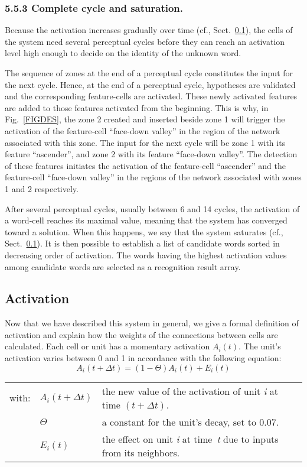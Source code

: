 \documentclass[ijdar]{svjour}
\begin{document}
\subsubsection{5.5.3 Complete cycle and saturation.}


Because the activation increases gradually over time ({cf.},  Sect.~\ref{sec-act}), the cells of the system need several perceptual cycles before they can reach an activation level high enough to decide on the identity of the unknown word.

The sequence of zones at the end of a perceptual cycle constitutes the input for the next cycle.
Hence, at the end of a perceptual cycle, hypotheses are validated and the corresponding feature-cells are activated.
These newly activated features are added to those features activated from the beginning.
This is why, in Fig.~\ref{FIGDES}, the zone 2 created and inserted beside zone 1 will trigger the activation of the feature-cell ``face-down valley'' in the region of the network associated with this zone.
The input for the next cycle will be zone 1 with its feature ``ascender'', and zone 2 with its feature ``face-down valley''.
The detection of these features initiates the activation of the feature-cell ``ascender'' and the feature-cell ``face-down valley'' in the regions of the network associated with zones 1 and 2 respectively.

After several perceptual cycles, usually between 6 and 14 cycles, the activation of a word-cell reaches its maximal value, meaning that the system has converged toward a solution.
When this happens, we say that the system saturates ({cf.},  Sect.~\ref{sec-act}).
It is then possible to establish a list of candidate words sorted in decreasing order of activation.
The words having the highest activation values among candidate words are selected as a recognition result array.


\subsection{Activation}
\label{sec-act}

Now that we have described this system in general, we give a formal definition of activation and explain how the weights of the connections between cells are calculated.
Each cell or unit has a momentary activation $A_{i}(t)$.
The unit's activation varies between 0 and 1 in accordance with the following equation:
%
\begin{equation}
A_{i}(t + \Delta t) = (1 - \Theta)A_{i}(t) +  E_{i}(t)
\label{eq:act}
\end{equation}
%
\begin{tabular}{@{}p{9mm}@{}p{1.85cm}@{}p{5.8cm}@{}}
with:   &$A_{i}(t + \Delta t)$  &the new value of the activation
                                        of unit {\em{i}} at time $(t + \Delta t)$.\\
                &$\Theta$               &a constant for the unit's decay, set to 0.07.\\
                &$E_{i}(t)$             &the effect on unit {\em{i}} at \mbox{time {\em{t}}}
                                        due to inputs from its neighbors.
\end{tabular}
\end{document}
